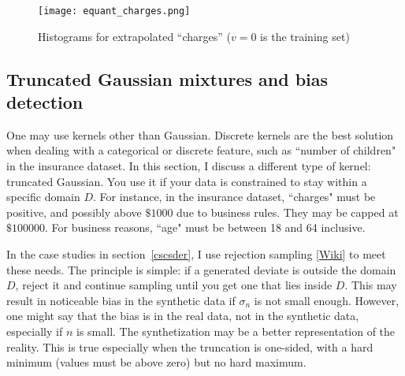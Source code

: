 \documentclass[oneside,10pt]{book}
\begin{document}
\begin{figure}[H]
\centering
\texttt{[image: equant\_charges.png]}
\caption{Histograms for extrapolated ``charges'' ($v=0$ is the training set)}
\label{figttyd38675}
\end{figure}


\subsection{Truncated Gaussian mixtures and bias detection}

 One may use kernels other than Gaussian. Discrete kernels are the best solution when dealing with a
 categorical or discrete
 feature, such as ``number of children" in the insurance dataset. In this section, I discuss a different type
 of kernel: \textcolor{index}{truncated Gaussian}. You use it if your data is constrained to stay within a specific domain $D$.
 For instance, in the insurance dataset, ``charges" must be positive, and possibly above $\$1000$ due to
 business rules. They may be capped at $\$\num{100000}$. For business reasons, ``age" must be
 between 18 and 64 inclusive.

In the case studies in section~\ref{cscsder}, I use \textcolor{index}{rejection sampling} [\href{https://en.wikipedia.org/wiki/Rejection_sampling}{Wiki}] to meet these needs. The principle is simple:
 if a generated deviate is outside the domain $D$, reject it and continue sampling until you get one that lies inside $D$. This may result in noticeable bias in the synthetic data if $\sigma_n$ is not small enough.
 However, one might say that the bias is in the real data,  not in the synthetic data, especially if $n$ is small.
 The synthetization may be a better representation of the reality. This is true especially when the truncation
 is one-sided, with a hard minimum (values must be above zero) but no hard maximum.
\end{document}
